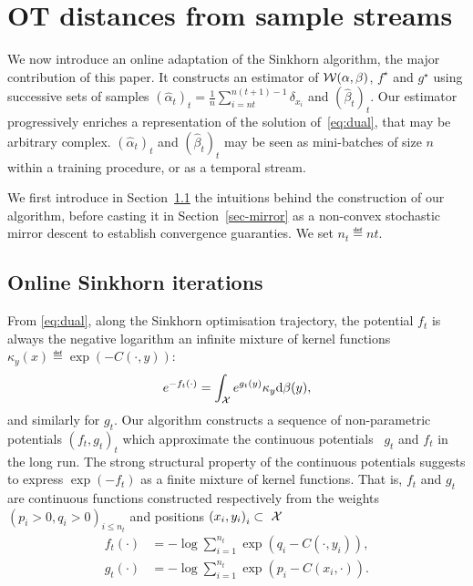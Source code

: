 
\section{OT distances from sample streams}

We now introduce an online adaptation of the Sinkhorn algorithm, the major
contribution of this paper. It constructs an estimator of
$\mathcal{W}(\alpha,\beta)$, $f^\star$ and $g^\star$ using successive sets of samples
$(\hat \alpha_t)_t = \frac{1}{n} \sum_{i=nt}^{n(t+1) - 1} \delta_{x_i}$ and
${(\hat \beta_t)}_t$. 
%
Our estimator progressively enriches a representation of the
solution of~\eqref{eq:dual}, that may be arbitrary complex. $(\hat \alpha_t)_t$
and $(\hat \beta_t)_t$ may be seen as mini-batches of size $n$ within a training procedure,
or as a temporal stream. 

We first introduce in Section~\ref{sec-online-sink-iter} the intuitions behind the construction of our algorithm,
before casting it in Section~\ref{sec-mirror} as a non-convex stochastic mirror descent to establish convergence guaranties. 
%
We set $n_t \eqdef nt$.


\subsection{Online Sinkhorn iterations}
\label{sec-online-sink-iter}

From \eqref{eq:dual}, along the Sinkhorn optimisation trajectory, the potential $f_t$ is always the negative logarithm an
infinite mixture of kernel functions $\kappa_y(x) \eqdef \exp(-C(\cdot, y))$:
\begin{equation*}
    e^{-f_t(\cdot)} = 
    \int_{\mathcal{X}} e^{g_t(y)}  \kappa_y  \textrm{d} \beta(y),
\end{equation*}
and similarly for $g_t$. Our algorithm constructs a sequence of
non-parametric potentials $(f_t, g_t)_t$ which approximate the continuous
potentials  $g_t$ and $f_t$ in the long run. The strong structural property of
the continuous potentials suggests to express
$\exp(-f_t)$ as a finite mixture of kernel functions.
That is, $f_t$ and $g_t$ are continuous functions constructed
respectively from the weights ${(p_i > 0, q_i > 0)}_{i \leq n_t}$ and
positions ${(x_i, y_i)}_{i} \subset~\mathcal{X}$
\begin{align}\label{eq:param}
    f_t(\cdot) &= - \log \sum_{i=1}^{n_t} 
    \exp(q_i - C(\cdot, y_i)),  \\
    g_t(\cdot) &= - \log \sum_{i=1}^{n_t}
    \exp(p_i - C(x_i, \cdot)).
\end{align}

